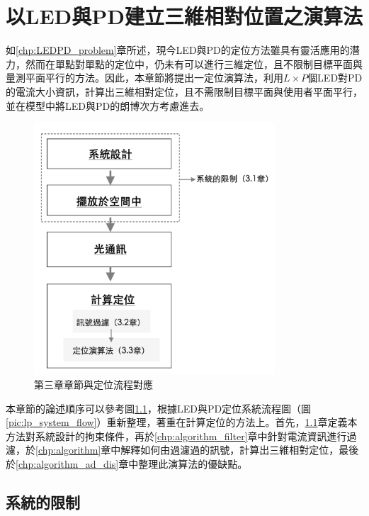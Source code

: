 \chapter{以LED與PD建立三維相對位置之演算法}
\label{chp:3}

如\ref{chp:LEDPD_problem}章所述，現今LED與PD的定位方法雖具有靈活應用的潛力，然而在單點對單點的定位中，仍未有可以進行三維定位，且不限制目標平面與量測平面平行的方法。因此，本章節將提出一定位演算法，利用$L\times P$個LED對PD的電流大小資訊，計算出三維相對定位，且不需限制目標平面與使用者平面平行，並在模型中將LED與PD的朗博次方考慮進去。

\begin{figure}[h!]
    \centering
    \includegraphics[width=9cm]{ch3pic/chp3_flow.png}
    \caption{第三章章節與定位流程對應}
    \label{pic:chp3_flow}
\end{figure}


本章節的論述順序可以參考圖\ref{pic:chp3_flow}，根據LED與PD定位系統流程圖（圖\ref{pic:lp_system_flow}）重新整理，著重在計算定位的方法上。首先，\ref{chp:algorithm_constraint}章定義本方法對系統設計的拘束條件，再於\ref{chp:algorithm_filter}章中針對電流資訊進行過濾，於\ref{chp:algorithm}章中解釋如何由過濾過的訊號，計算出三維相對定位，最後於\ref{chp:algorithm_ad_dis}章中整理此演算法的優缺點。








\section{系統的限制}
\label{chp:algorithm_constraint}

